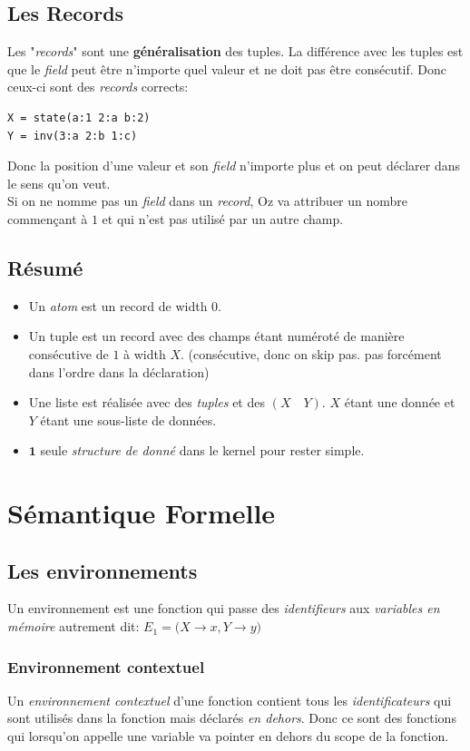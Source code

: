 \documentclass{report}
\begin{document}
\subsection{Les Records} \label{record}
Les "\textit{records}" sont une \textbf{généralisation} des tuples. La différence avec les tuples est que le \textit{field} peut être n'importe quel valeur et ne doit pas être consécutif. Donc ceux-ci sont des \textit{records} corrects:
\begin{lstlisting}
X = state(a:1 2:a b:2)
Y = inv(3:a 2:b 1:c)
\end{lstlisting}
Donc la position d'une valeur et son \textit{field} n'importe plus et on peut déclarer dans le sens qu'on veut.\\
Si on ne nomme pas un \textit{field} dans un \textit{record}, Oz va attribuer un nombre commençant à $1$ et qui n'est pas utilisé par un autre champ.\\
\subsection{Résumé}
\begin{itemize}
\item Un \textit{atom} est un record de width $0$.
\item Un tuple est un record avec des champs étant numéroté de manière consécutive de $1$ à width $X$. (consécutive, donc on skip pas. pas forcément dans l'ordre dans la déclaration)
\item Une liste est réalisée avec des \textit{tuples} et des $(X \quad Y)$. $X$ étant une donnée et $Y$ étant une sous-liste de données.
\item $\textbf{1}$ seule \textit{structure de donné} dans le kernel pour rester simple.
\end{itemize}

\section{Sémantique Formelle}
\subsection{Les environnements}
Un environnement est une fonction qui passe des \textit{identifieurs} aux \textit{variables en mémoire} autrement dit: $E_1 = ({X \rightarrow x, Y \rightarrow y)}$

\subsubsection{Environnement contextuel}
Un \textit{environnement contextuel} d'une fonction contient tous les \textit{identificateurs} qui sont utilisés dans la fonction mais déclarés \textit{en dehors}. Donc ce sont des fonctions qui lorsqu'on appelle une variable va pointer en dehors du scope de la fonction.
\end{document}
